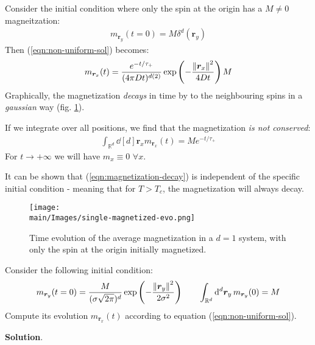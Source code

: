 \documentclass[../../main.tex]{subfiles}
\begin{document}
\begin{example}
    Consider the initial condition where only the spin at the origin has a $M \neq 0$ magneitzation:
    \begin{align*}
        m_{\bm{r}_y}(t=0) = M \delta^d(\bm{r}_y)
    \end{align*}
    Then (\ref{eqn:non-uniform-sol}) becomes:
    \begin{align*}
        m_{\bm{r}_x}(t) = \frac{e^{-t/\tau_+}}{(4 \pi D t)^{d(2)}} \exp\left(-\frac{\norm{\bm{r}_x}^2}{4 D t} \right) M
    \end{align*}
    Graphically, the magnetization \textit{decays} in time by  to the neighbouring spins in a \textit{gaussian} way (fig. \ref{fig:single-magnetized-evo}). 
    
    \medskip

    If we integrate over all positions, we find that the magnetization \textit{is not conserved}: 
    \begin{align}\label{eqn:magnetization-decay}
        \int_{\mathbb{R}^d} \dd[d]{\bm{r}_x} m_{\bm{r}_x}(t) = M e^{-t/\tau_+}
    \end{align}
    For $t \to +\infty$ we will have $m_{x} \equiv 0$ $\forall x$.

    \medskip

    It can be shown that (\ref{eqn:magnetization-decay}) is independent of the specific initial condition - meaning that for $T > T_c$, the magnetization will always decay.
\end{example}

\begin{figure}[H]
    \centering
    \texttt{[image: \\main/Images/single-magnetized-evo.png]}
    \caption{Time evolution of the average magnetization in a $d=1$ system, with only the spin at the origin initially magnetized.}
    \label{fig:single-magnetized-evo}
\end{figure}

\begin{exo}
    Consider the following initial condition:
    \begin{align*}
        m_{\bm{r}_y}(t=0) = \frac{M}{(\sigma \sqrt{2 \pi})^d} \exp\left(-\frac{\norm{\bm{r}_y}^2}{2 \sigma^2} \right) \qquad \int_{\mathbb{R}^d} \dd[d]{\bm{r}_y} m_{\bm{r}_y}(0) = M
    \end{align*}
    Compute its evolution $m_{\bm{r}_x}(t)$ according to equation (\ref{eqn:non-uniform-sol}).

    \medskip

    \textbf{Solution}. 
\end{exo}
\end{document}
